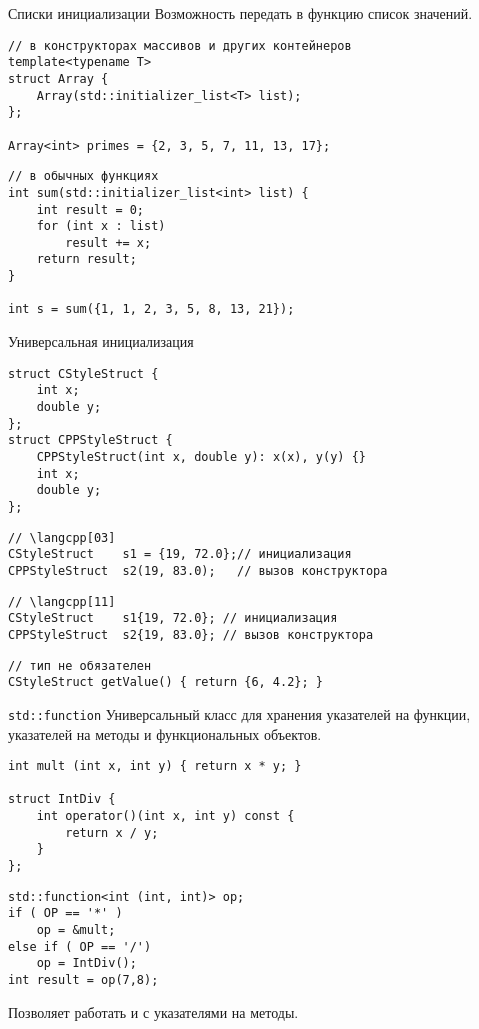 \documentclass[aspectration=1610,t]{beamer}
\begin{document}
\begin{frame}[fragile]{Списки инициализации}
Возможность передать в функцию список значений.
\begin{lstlisting}
// в конструкторах массивов и других контейнеров
template<typename T>
struct Array {
    Array(std::initializer_list<T> list);
};

Array<int> primes = {2, 3, 5, 7, 11, 13, 17};
\end{lstlisting}

\begin{lstlisting}
// в обычных функциях
int sum(std::initializer_list<int> list) {
    int result = 0;
    for (int x : list) 
        result += x;
    return result;
}

int s = sum({1, 1, 2, 3, 5, 8, 13, 21});
\end{lstlisting}
\end{frame}

\begin{frame}[fragile]{Универсальная инициализация}
\begin{lstlisting}
struct CStyleStruct {
    int x;
    double y;
};
struct CPPStyleStruct {
    CPPStyleStruct(int x, double y): x(x), y(y) {}
    int x;
    double y;
};
\end{lstlisting}

\begin{lstlisting}
// \langcpp[03]
CStyleStruct 	s1 = {19, 72.0};// инициализация
CPPStyleStruct  s2(19, 83.0); 	// вызов конструктора
\end{lstlisting}

\begin{lstlisting}
// \langcpp[11]
CStyleStruct 	s1{19, 72.0}; // инициализация
CPPStyleStruct  s2{19, 83.0}; // вызов конструктора
\end{lstlisting}

\begin{lstlisting}
// тип не обязателен
CStyleStruct getValue() { return {6, 4.2}; } 
\end{lstlisting}
\end{frame}


\begin{frame}[fragile]{{\tt std::function}}
Универсальный класс для хранения указателей на функции,\\
указателей на методы и функциональных объектов.
\begin{lstlisting}
int mult (int x, int y) { return x * y; }

struct IntDiv { 
    int operator()(int x, int y) const { 
        return x / y; 
    } 
};
\end{lstlisting}
\begin{lstlisting}
std::function<int (int, int)> op; 
if ( OP == '*' )
    op = &mult;
else if ( OP == '/')
    op = IntDiv();
int result = op(7,8);
\end{lstlisting}
                  
Позволяет работать и с указателями на методы.
\end{frame}
\end{document}
